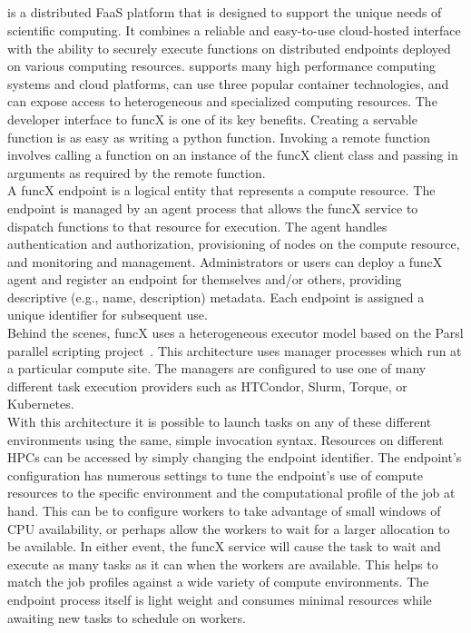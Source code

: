\subsection{\funcX{}}\label{subsec:funcX}
\funcX{} is a distributed FaaS platform that is designed to support the unique needs of scientific computing. It combines a reliable and easy-to-use cloud-hosted interface with the ability to securely execute functions on distributed endpoints deployed on various computing resources. \funcX{} supports many high performance computing systems and cloud platforms, can use three popular container technologies, and can expose access to heterogeneous and specialized computing resources. The developer interface to funcX is one of its key benefits. Creating a servable function is as easy as writing a python function. Invoking a remote function involves calling a function on an instance of the funcX client class and passing in arguments as required by the remote function.\\

A funcX endpoint is a logical entity that represents a compute resource. The endpoint is managed by an agent process that allows the funcX service to dispatch functions to that resource for execution. The agent handles authentication and authorization, provisioning of nodes on the compute resource, and monitoring and management. Administrators or users can deploy a funcX agent and register an endpoint for themselves and/or others, providing descriptive (e.g., name, description) metadata. Each endpoint is assigned a unique identifier for subsequent use.\\

Behind the scenes, funcX uses a heterogeneous executor model based on the Parsl parallel scripting project~\cite{Parsl_paper}.  This architecture uses manager processes which run at a particular compute site. The managers are configured to use one of many different task execution providers such as HTCondor, Slurm, Torque, or Kubernetes.\\

With this architecture it is possible to launch tasks on any of these different environments using the same, simple invocation syntax. Resources on different HPCs can be accessed by simply changing the endpoint identifier. The endpoint's configuration has numerous settings to tune the endpoint's use of compute resources to the specific environment and the computational profile of the job at hand. This can be to configure workers to take advantage of small windows of CPU availability, or perhaps allow the workers to wait for a larger allocation to be available. In either event, the funcX service will cause the task to wait and execute as many tasks as it can when the workers are available.  This helps to match the job profiles against a wide variety of compute environments. The endpoint process itself is light weight and consumes minimal resources while awaiting new tasks to schedule on workers.\\

